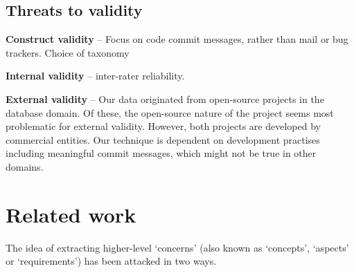 \documentclass{acm_proc_article-sp}
\begin{document}
\subsection{Threats to validity}
\textbf{Construct validity} -- Focus on code commit messages, rather than mail or bug trackers. Choice of taxonomy

\textbf{Internal validity} -- inter-rater reliability.

\textbf{External validity} -- Our data originated from open-source projects in the database domain. Of these, the open-source nature of the project seems most problematic for external validity. However, both projects are developed by commercial entities. Our technique is dependent on development practises including meaningful commit messages, which might not be true in other domains.

\section{Related work}




The idea of extracting higher-level `concerns' (also known as `concepts', `aspects' or `requirements') has been attacked in two ways. 
\end{document}
